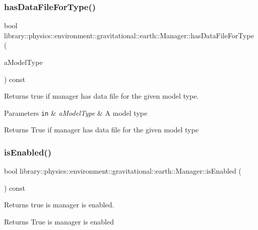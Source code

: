 \subsubsection{\texorpdfstring{has\+Data\+File\+For\+Type()}{hasDataFileForType()}}
{\footnotesize\ttfamily bool library\+::physics\+::environment\+::gravitational\+::earth\+::\+Manager\+::has\+Data\+File\+For\+Type (\begin{DoxyParamCaption}\item[{const \hyperlink{classlibrary_1_1physics_1_1environment_1_1gravitational_1_1_earth_ab20a2b260831c66ac10f7b9a307d25ca}{Earth\+Gravitational\+Model\+::\+Type} \&}]{a\+Model\+Type }\end{DoxyParamCaption}) const}



Returns true if manager has data file for the given model type. 


\begin{DoxyParams}[1]{Parameters}
\mbox{\tt in}  & {\em a\+Model\+Type} & A model type \\
\hline
\end{DoxyParams}
\begin{DoxyReturn}{Returns}
True if manager has data file for the given model type 
\end{DoxyReturn}
\mbox{\label{classlibrary_1_1physics_1_1environment_1_1gravitational_1_1earth_1_1_manager_ab67b0c27b06ae166aae145826df17426}} 
\subsubsection{\texorpdfstring{is\+Enabled()}{isEnabled()}}
{\footnotesize\ttfamily bool library\+::physics\+::environment\+::gravitational\+::earth\+::\+Manager\+::is\+Enabled (\begin{DoxyParamCaption}{ }\end{DoxyParamCaption}) const}



Returns true is manager is enabled. 

\begin{DoxyReturn}{Returns}
True is manager is enabled 
\end{DoxyReturn}
\mbox{\label{classlibrary_1_1physics_1_1environment_1_1gravitational_1_1earth_1_1_manager_a5c11d0bc12faf4b8761a458583edaa05}} 
